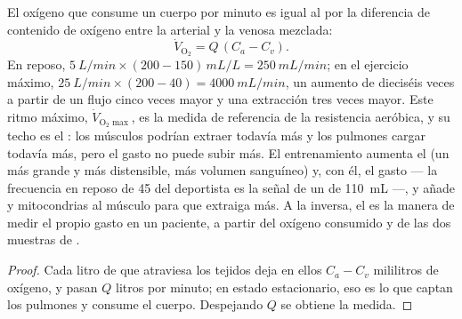\begin{theorem}\label{thm:b2:blood-pressure:fick}
El oxígeno que consume un cuerpo por minuto es igual al 
por la diferencia de contenido de oxígeno entre la  arterial y la
 venosa mezclada:
\[
\dot V_{\mathrm{O_2}} = Q\,(C_a - C_v).
\]
En reposo, $\qty{5}{L/min}\times(200 - 150)\,\unit{mL/L} = \qty{250}{mL/min}$;
en el ejercicio máximo, $\qty{25}{L/min}\times(200 - 40) =
\qty{4000}{mL/min}$, un aumento de dieciséis veces a partir de un flujo
cinco veces mayor y una extracción tres veces mayor. Este ritmo máximo,
$\dot V_{\mathrm{O_2}\max}$, es la medida de referencia de la resistencia
aeróbica, y su techo es el : los músculos podrían extraer todavía
más y los pulmones cargar todavía más, pero el gasto no puede subir más.
El entrenamiento aumenta el  (un  más grande y
más distensible, más volumen sanguíneo) y, con él, el gasto --- la
frecuencia en reposo de 45 del deportista es la señal de un  de \qty{110}{mL} ---, y añade  y mitocondrias al músculo
para que extraiga más. A la inversa, el  es la manera de
medir el propio gasto en un paciente, a partir del oxígeno consumido y de
las dos muestras de .
\end{theorem}
\begin{proof}
Cada litro de  que atraviesa los tejidos deja en ellos $C_a - C_v$
mililitros de oxígeno, y pasan $Q$ litros por minuto; en estado
estacionario, eso es lo que captan los pulmones y consume el cuerpo.
Despejando $Q$ se obtiene la medida.
\end{proof}

